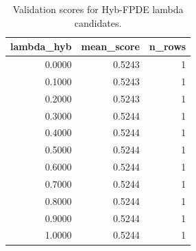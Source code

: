 \begin{table}[t]
\caption{Validation scores for Hyb-FPDE lambda candidates.}
\label{tab:lambda_distribution_computed}
\centering
\begin{tabular}{rrr}
\toprule
lambda\_hyb & mean\_score & n\_rows \\
\midrule
0.0000 & 0.5243 & 1 \\
0.1000 & 0.5243 & 1 \\
0.2000 & 0.5243 & 1 \\
0.3000 & 0.5244 & 1 \\
0.4000 & 0.5244 & 1 \\
0.5000 & 0.5244 & 1 \\
0.6000 & 0.5244 & 1 \\
0.7000 & 0.5244 & 1 \\
0.8000 & 0.5244 & 1 \\
0.9000 & 0.5244 & 1 \\
1.0000 & 0.5244 & 1 \\
\bottomrule
\end{tabular}

\end{table}
